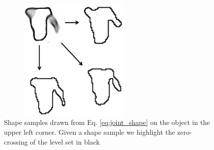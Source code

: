 \documentclass[journal,transmag]{IEEEtran}%
\begin{document}
\begin{figure}[ht!]
\centering
\includegraphics[width = 7.5cm, height= 6cm ]{figures/Slide13.jpg}
\caption{Shape samples drawn from Eq. \ref{eq:joint_shape} on the object in the upper left corner. Given a shape sample we highlight the zero-crossing of the level set in black}
\vspace*{-10pt}
\label{fig:shape_samples}
\end{figure}
\end{document}
